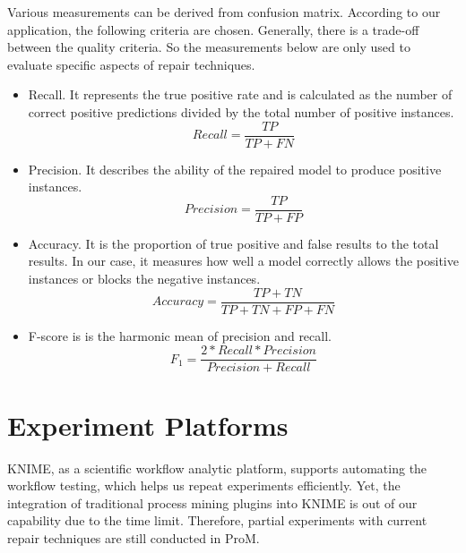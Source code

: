 Various measurements can be derived from confusion matrix. According to our application, the following criteria are chosen. Generally, there is a trade-off between the quality criteria. So the measurements below are only used to evaluate specific aspects of repair techniques.
\begin{itemize}
	\item Recall. It represents the true positive rate and is calculated as the number of correct positive predictions divided by the total number of positive instances.
	\[Recall = \frac{TP}{TP + FN}\]
	\item Precision. It describes the ability of the repaired model to produce positive instances.
	\[Precision = \frac{TP}{TP + FP }\]
	\item Accuracy. It is the proportion of true positive and false results to the total results. In our case, it measures how well a model correctly allows the positive instances or blocks the negative instances.
	\[Accuracy = \frac{TP+TN}{TP+TN+FP+FN}\]
	\item F-score is is the harmonic mean of precision and recall.
	\[F_1 = \frac{2*Recall*Precision}{Precision + Recall}\]
\end{itemize}

\section{Experiment Platforms}
KNIME, as a scientific workflow analytic platform, supports automating the workflow testing, which helps us repeat experiments efficiently. Yet, the integration of traditional process mining plugins into KNIME is out of our capability due to the time limit. Therefore, partial experiments with current repair techniques are still conducted in ProM. 
